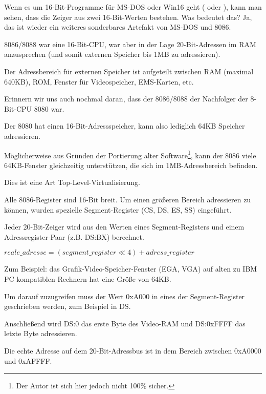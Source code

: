 \label{8086_memory_model}

Wenn es um 16-Bit-Programme für MS-DOS oder Win16 geht (
oder ), kann man sehen, dass die Zeiger aus zwei
16-Bit-Werten bestehen.
Was bedeutet das? Ja, das ist wieder ein weiteres sonderbares Artefakt von MS-DOS
und 8086.

8086/8088 war eine 16-Bit-CPU, war aber in der Lage 20-Bit-Adressen im RAM anzusprechen
(und somit externen Speicher bis 1MB zu adressieren).

Der Adressbereich für externen Speicher ist aufgeteilt zwischen \ac{RAM} (maximal 640KB),
\ac{ROM}, Fenster für Videospeicher, EMS-Karten, etc.

Erinnern wir uns auch nochmal daran, dass der 8086/8088 der Nachfolger der 8-Bit-CPU
8080 war.

Der 8080 hat einen 16-Bit-Adressspeicher, kann also lediglich 64KB Speicher adressieren.

Möglicherweise aus Gründen der Portierung alter Software\footnote{Der Autor ist sich hier jedoch nicht 100\% sicher.},
kann der 8086 viele 64KB-Fenster gleichzeitig unterstützen, die sich im 1MB-Adressbereich
befinden.

Dies ist eine Art Top-Level-Virtualisierung.

Alle 8086-Register sind 16-Bit breit. Um einen größeren Bereich adressieren zu können,
wurden spezielle Segment-Register (CS, DS, ES, SS)  eingeführt.

Jeder 20-Bit-Zeiger wird aus den Werten eines Segment-Registers und einem
Adressregister-Paar (z.B. DS:BX) berechnet.

\begin{center}
$reale\_adresse = (segment\_register \ll 4) + adress\_register$
\end{center}

Zum Beispiel: das Grafik-Video-Speicher-Fenster (\ac{EGA}, \ac{VGA}) auf alten zu
IBM PC kompatiblen Rechnern hat eine Größe von 64KB.

Um darauf zuzugreifen muss der Wert 0xA000 in eines der Segment-Register geschrieben
werden, zum Beispiel in DS.

Anschließend wird DS:0 das erste Byte des Video-RAM und DS:0xFFFF das letzte
Byte adressieren.

Die echte Adresse auf dem 20-Bit-Adressbus ist in dem Bereich zwischen 0xA0000
und 0xAFFFF.

